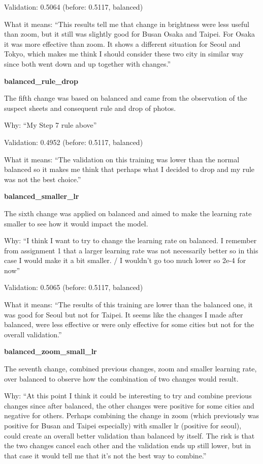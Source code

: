 \documentclass[11pt]{article}
\begin{document}
{Validation: 0.5064 (before: 0.5117, balanced)\par
What it means: ``This results tell me that change in brightness were less useful than zoom, but it still was slightly good for Busan Osaka and Taipei. For Osaka it was more effective than zoom. It shows a different situation for Seoul and Tokyo, which makes me think I should consider these two city in similar way since both went down and up together with changes.''
\par\medskip\noindent\textbf{balanced\_rule\_drop}\par
The fifth change was based on balanced and came from the observation of the suspect sheets and consequent rule and drop of photos.\par
Why: ``My Step 7 rule above''\par
Validation: 0.4952 (before: 0.5117, balanced)\par
What it means: ``The validation on this training was lower than the normal balanced so it makes me think that perhaps what I decided to drop and my rule was not the best choice.''
\par\medskip\noindent\textbf{balanced\_smaller\_lr}\par
The sixth change was applied on balanced and aimed to make the learning rate smaller to see how it would impact the model.\par
Why: ``I think I want to try to change the learning rate on balanced. I remember from assignment 1 that a larger learning rate was not necessarily better so in this case I would make it a bit smaller. / I wouldn't go too much lower so 2e-4 for now''\par
Validation: 0.5065 (before: 0.5117, balanced)\par
What it means: ``The results of this training are lower than the balanced one, it was good for Seoul but not for Taipei. It seems like the changes I made after balanced, were less effective or were only effective for some cities but not for the overall validation.''
\par\medskip\noindent\textbf{balanced\_zoom\_small\_lr}\par
The seventh change, combined previous changes, zoom and smaller learning rate, over balanced to observe how the combination of two changes would result.\par
Why: ``At this point I think it could be interesting to try and combine previous changes since after balanced, the other changes were positive for some cities and negative for others. Perhaps combining the change in zoom (which previously was positive for Busan and Taipei especially) with smaller lr (positive for seoul), could create an overall better validation than balanced by itself. The risk is that the two changes cancel each other and the validation ends up still lower, but in that case it would tell me that it's not the best way to combine.''\par
}
\end{document}
